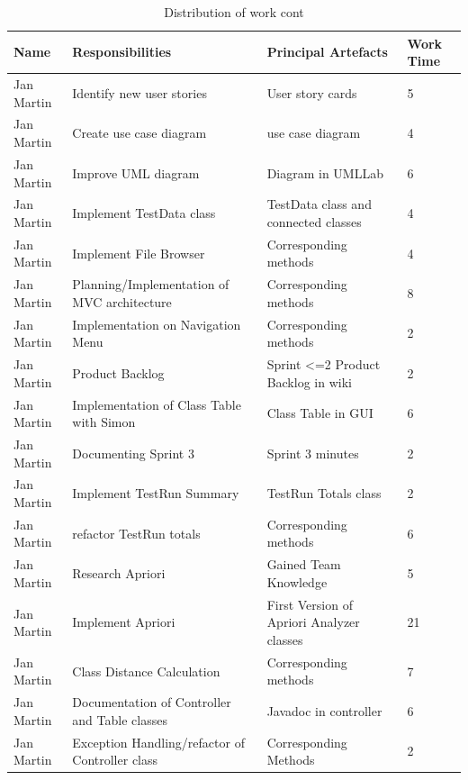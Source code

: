\newpage
\begin{table}[!h]
  \caption{Distribution of work cont}
  \centering
  \begin{tabular}{p{2cm}||p{4.2cm}|p{4cm}|l|}
    Name & Responsibilities & Principal Artefacts & Work Time\\
    \hline
    \hline
    Jan Martin & Identify new user stories & User story cards & 5 \\
    \hline
    Jan Martin & Create use case diagram & use case diagram & 4 \\ 
    \hline
    Jan Martin & Improve UML diagram & Diagram in UMLLab & 6 \\ 
    \hline  
    Jan Martin & Implement TestData class & TestData class and connected classes & 4 \\ 
    \hline  
    Jan Martin & Implement File Browser & Corresponding methods & 4 \\ 
    \hline
    Jan Martin & Planning/Implementation of MVC architecture & Corresponding methods & 8 \\ 
    \hline  
    Jan Martin & Implementation on Navigation Menu & Corresponding methods & 2 \\ 
    \hline  
    Jan Martin & Product Backlog & Sprint <=2 Product Backlog in wiki & 2 \\ 
    \hline  
    Jan Martin & Implementation of Class Table with Simon & Class Table in GUI & 6 \\ 
    \hline  
    Jan Martin & Documenting Sprint 3 & Sprint 3 minutes & 2 \\ 
    \hline 
    Jan Martin & Implement TestRun Summary & TestRun Totals class & 2 \\ 
    \hline  
    Jan Martin & refactor TestRun totals & Corresponding methods & 6 \\ 
    \hline  
    Jan Martin & Research Apriori & Gained Team Knowledge & 5 \\ 
    \hline  
    Jan Martin & Implement Apriori & First Version of Apriori Analyzer classes & 21 \\ 
    \hline  
    Jan Martin & Class Distance Calculation & Corresponding methods & 7 \\ 
    \hline  
    Jan Martin & Documentation of Controller and Table classes & Javadoc in controller & 6 \\ 
    \hline    
    Jan Martin & Exception Handling/refactor of Controller class & Corresponding Methods & 2 \\ 
    \hline  
    \hline
  \end{tabular}
\end{table}    
